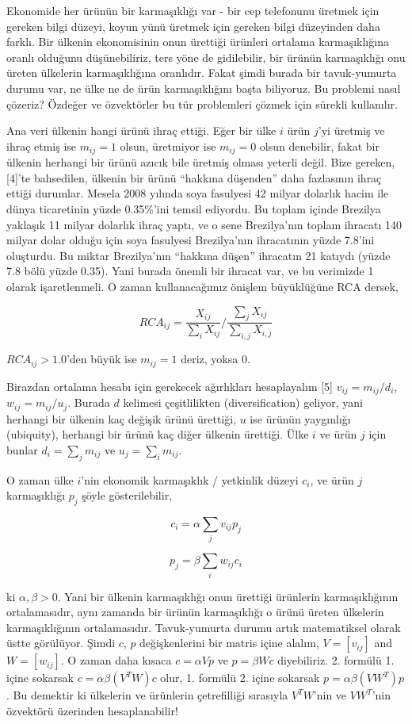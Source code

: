 \documentclass[12pt,fleqn]{article}\usepackage{../../common}
\begin{document}
Ekonomide her ürünün bir karmaşıklığı var - bir cep telefonunu üretmek için
gereken bilgi düzeyi, koyun yünü üretmek için gereken bilgi düzeyinden daha
farklı. Bir ülkenin ekonomisinin onun ürettiği ürünleri ortalama
karmaşıklığına oranlı olduğunu düşünebiliriz, ters yöne de gidilebilir, bir
ürünün karmaşıklığı onu üreten ülkelerin karmaşıklığına oranlıdır. Fakat
şimdi burada bir tavuk-yumurta durumu var, ne ülke ne de ürün
karmaşıklığını başta biliyoruz. Bu problemi nasıl çözeriz? Özdeğer ve
özvektörler bu tür problemleri çözmek için sürekli kullanılır.

Ana veri ülkenin hangi ürünü ihraç ettiği. Eğer bir ülke $i$ ürün $j$'yi
üretmiş ve ihraç etmiş ise $m_{ij}=1$ olsun, üretmiyor ise $m_{ij}=0$ olsun
denebilir, fakat bir ülkenin herhangi bir ürünü azıcık bile üretmiş olması
yeterli değil. Bize gereken, [4]'te bahsedilen, ülkenin bir ürünü ``hakkına
düşenden'' daha fazlasının ihraç ettiği durumlar. Mesela 2008 yılında soya
fasulyesi 42 milyar dolarlık hacim ile dünya ticaretinin yüzde 0.35\%'ini
temsil ediyordu. Bu toplam içinde Brezilya yaklaşık 11 milyar dolarlık
ihraç yaptı, ve o sene Brezilya'nın toplam ihracatı 140 milyar dolar olduğu
için soya fasulyesi Brezilya'nın ihracatının yüzde 7.8'ini oluşturdu. Bu
miktar Brezilya'nın ``hakkına düşen'' ihracatın 21 katıydı (yüzde 7.8 bölü
yüzde 0.35). Yani burada önemli bir ihracat var, ve bu verimizde 1 olarak
işaretlenmeli. O zaman kullanacağımız önişlem büyüklüğüne RCA dersek,

$$
RCA_{ij} = \frac{X_{ij}}{\sum_i X_{ij}} / \frac{\sum_j X_{ij}}{\sum_{i,j} X_{i,j}}
$$

$RCA_{ij} > 1.0$'den büyük ise $m_{ij}=1$ deriz, yoksa 0. 

Birazdan ortalama hesabı için gerekecek ağırlıkları hesaplayalım [5]
$v_{ij} = m_{ij} / d_i$, $w_{ij}=m_{ij}/u_j$. Burada $d$ kelimesi
çeşitlilikten (diversification) geliyor, yani herhangi bir ülkenin kaç
değişik ürünü ürettiği, $u$ ise ürünün yaygınlığı (ubiquity), herhangi bir
ürünü kaç diğer ülkenin ürettiği. Ülke $i$ ve ürün $j$ için bunlar
$d_i = \sum_j m_{ij}$ ve $u_j = \sum_i m_{ij}$.

O zaman ülke $i$'nin ekonomik karmaşıklık / yetkinlik düzeyi $c_i$, ve ürün
$j$ karmaşıklığı $p_j$ şöyle gösterilebilir,

$$
c_i = \alpha \sum_j v_{ij} p_j
$$

$$
p_j  = \beta \sum_i w_{ij} c_i
$$

ki $\alpha,\beta > 0$. Yani bir ülkenin karmaşıklığı onun ürettiği ürünlerin
karmaşıklığının ortalamasıdır, aynı zamanda bir ürünün karmaşıklığı o ürünü
üreten ülkelerin karmaşıklığının ortalamasıdır. Tavuk-yumurta durumu artık
matematiksel olarak üstte görülüyor. Şimdi $c$, $p$ değişkenlerini bir
matris içine alalım, $V=[v_{ij}]$ and $W=[w_{ij}]$. O zaman daha kısaca
$c = \alpha V p$ ve $p = \beta W c$ diyebiliriz. 2. formülü 1. içine
sokarsak $c = \alpha \beta (V^T W) c$ olur, 1. formülü 2. içine sokarsak
$p = \alpha \beta (V W^T) p$. Bu demektir ki ülkelerin ve ürünlerin
çetrefilliği sırasıyla $V^T W$'nin ve $V W^T$'nin özvektörü üzerinden
hesaplanabilir!
\end{document}
